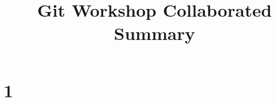 \documentclass[11pt]{article}
\title{Git Workshop Collaborated Summary}
\author{}
\date{}
\begin{document}
\maketitle
\tableofcontents
\pagebreak


\section{1}
\end{document}
